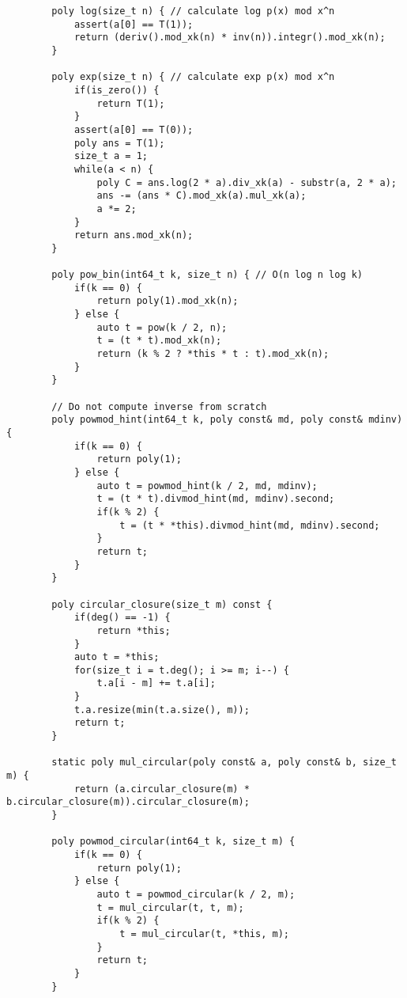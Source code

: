 \begin{lstlisting}
        poly log(size_t n) { // calculate log p(x) mod x^n
            assert(a[0] == T(1));
            return (deriv().mod_xk(n) * inv(n)).integr().mod_xk(n);
        }
        
        poly exp(size_t n) { // calculate exp p(x) mod x^n
            if(is_zero()) {
                return T(1);
            }
            assert(a[0] == T(0));
            poly ans = T(1);
            size_t a = 1;
            while(a < n) {
                poly C = ans.log(2 * a).div_xk(a) - substr(a, 2 * a);
                ans -= (ans * C).mod_xk(a).mul_xk(a);
                a *= 2;
            }
            return ans.mod_xk(n);
        }
        
        poly pow_bin(int64_t k, size_t n) { // O(n log n log k)
            if(k == 0) {
                return poly(1).mod_xk(n);
            } else {
                auto t = pow(k / 2, n);
                t = (t * t).mod_xk(n);
                return (k % 2 ? *this * t : t).mod_xk(n);
            }
        }
        
        // Do not compute inverse from scratch
        poly powmod_hint(int64_t k, poly const& md, poly const& mdinv) {
            if(k == 0) {
                return poly(1);
            } else {
                auto t = powmod_hint(k / 2, md, mdinv);
                t = (t * t).divmod_hint(md, mdinv).second;
                if(k % 2) {
                    t = (t * *this).divmod_hint(md, mdinv).second;
                }
                return t;
            }
        }

        poly circular_closure(size_t m) const {
            if(deg() == -1) {
                return *this;
            }
            auto t = *this;
            for(size_t i = t.deg(); i >= m; i--) {
                t.a[i - m] += t.a[i];
            }
            t.a.resize(min(t.a.size(), m));
            return t;
        }

        static poly mul_circular(poly const& a, poly const& b, size_t m) {
            return (a.circular_closure(m) * b.circular_closure(m)).circular_closure(m);
        }

        poly powmod_circular(int64_t k, size_t m) {
            if(k == 0) {
                return poly(1);
            } else {
                auto t = powmod_circular(k / 2, m);
                t = mul_circular(t, t, m);
                if(k % 2) {
                    t = mul_circular(t, *this, m);
                }
                return t;
            }
        }
        

\end{lstlisting}
